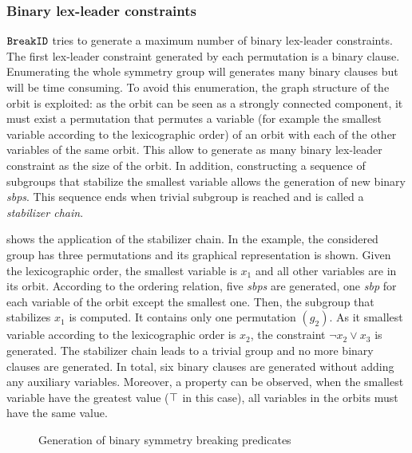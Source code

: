 
\subsubsection{Binary lex-leader constraints}

$\texttt{BreakID}$ tries to generate a maximum number of binary lex-leader constraints.
The first lex-leader constraint generated by each permutation is a binary clause.
Enumerating the whole symmetry group will generates many binary clauses but will be time consuming.
To avoid this enumeration, the  graph structure  of the orbit is exploited: as the orbit can be seen as a strongly connected component, it must exist a permutation that permutes a variable (for example the smallest variable according to the lexicographic order) of an orbit with each of the other variables of the same orbit. This allow to
generate as many binary lex-leader constraint as the size of the orbit. In addition, constructing 
a sequence of subgroups that stabilize the smallest variable allows the generation of new binary \textit{sbps}.
This sequence ends when trivial subgroup is reached and is called a  \emph{stabilizer chain}.

 shows the application of the stabilizer chain.
In the example, the considered group has three permutations and its graphical representation
is shown. Given the lexicographic order, the smallest variable is $x_1$ and 
all other variables are in its orbit. According to the ordering relation, five 
\textit{sbps} are generated, one \textit{sbp} for each variable of the orbit except the smallest one.
Then, the subgroup that stabilizes $x_1$ is computed. It contains only one permutation $(g_2)$.
As it smallest variable according to the lexicographic order is $x_2$, the constraint $\neg x_2 \lor x_3$ is generated. The stabilizer chain leads to a trivial group and no more binary clauses are generated.
In total, six binary clauses are generated without adding any auxiliary variables.
Moreover, a property can be observed, when the smallest variable have the greatest value 
($\top$ in this case), all variables in the orbits must have the same value.
 \begin{figure}[!htbp]
 
 \caption{Generation of binary symmetry breaking predicates}
 \label{fig:binary_sbp}
\end{figure}

